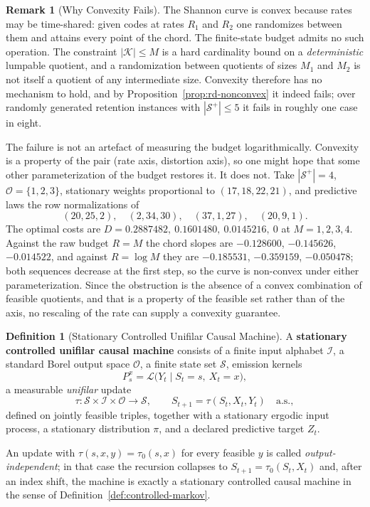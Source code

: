 \documentclass[12pt]{article}
\theoremstyle{definition}
\newtheorem{definition}[theorem]{Definition}
\newtheorem{remark}[theorem]{Remark}
\newcommand{\Splus}{\mathcal S^{+}}
\begin{document}
\begin{remark}[Why Convexity Fails]
\label{rem:rd-nonconvex-mechanism}
The Shannon curve is convex because rates may be time-shared: given codes at
rates $R_1$ and $R_2$ one randomizes between them and attains every point of
the chord.  The finite-state budget admits no such operation.  The constraint
$|\mathcal K|\le M$ is a hard cardinality bound on a \emph{deterministic}
lumpable quotient, and a randomization between quotients of sizes $M_1$ and
$M_2$ is not itself a quotient of any intermediate size.  Convexity therefore
has no mechanism to hold, and by
Proposition~\ref{prop:rd-nonconvex} it indeed fails; over randomly generated
retention instances with $|\Splus|\le5$ it fails in roughly one case in eight.

The failure is not an artefact of measuring the budget logarithmically.
Convexity is a property of the pair (rate axis, distortion axis), so one might
hope that some other parameterization of the budget restores it.  It does not.
Take $|\Splus|=4$, $\mathcal O=\{1,2,3\}$, stationary weights proportional to
$(17,18,22,21)$, and predictive laws the row normalizations of
\[
(20,25,2),\quad(2,34,30),\quad(37,1,27),\quad(20,9,1).
\]
The optimal costs are
$D=0.2887482,\ 0.1601480,\ 0.0145216,\ 0$ at $M=1,2,3,4$.  Against the raw
budget $R=M$ the chord slopes are $-0.128600$, $-0.145626$, $-0.014522$, and
against $R=\log M$ they are $-0.185531$, $-0.359159$, $-0.050478$; both
sequences decrease at the first step, so the curve is non-convex under either
parameterization.  Since the obstruction is the absence of a convex
combination of feasible quotients, and that is a property of the feasible set
rather than of the axis, no rescaling of the rate can supply a convexity
guarantee.
\end{remark}

\begin{definition}[Stationary Controlled Unifilar Causal Machine]
\label{def:unifilar-machine}
A \textbf{stationary controlled unifilar causal machine} consists of a finite
input alphabet $\mathcal I$, a standard Borel output space $\mathcal O$, a
finite state set $\mathcal S$, emission kernels
\[
P_s^x=\mathcal L\bigl(Y_t\mid S_t=s,\ X_t=x\bigr),
\]
a measurable \emph{unifilar} update
\[
\tau:\mathcal S\times\mathcal I\times\mathcal O\to\mathcal S,
\qquad
S_{t+1}=\tau(S_t,X_t,Y_t)\quad\text{a.s.},
\]
defined on jointly feasible triples, together with a stationary ergodic input
process, a stationary distribution $\pi$, and a declared predictive target
$Z_t$.

An update with $\tau(s,x,y)=\tau_0(s,x)$ for every feasible $y$ is called
\emph{output-independent}; in that case the recursion collapses to
$S_{t+1}=\tau_0(S_t,X_t)$ and, after an index shift, the machine is exactly a
stationary controlled causal machine in the sense of
Definition~\ref{def:controlled-markov}.
\end{definition}
\end{document}

